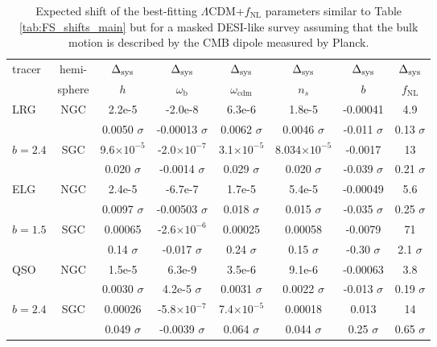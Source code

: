 \documentclass[a4paper,11pt]{article}
\begin{document}
\begin{table}[ht]
    \centering
    \begin{tabular}{|l|c|c|c|c|c|c|c|}
        \hline  tracer & hemi- & $\Delta_{\rm sys}$ &$\Delta_{\rm sys}$ &$\Delta_{\rm sys}$ &$\Delta_{\rm sys}$ &$\Delta_{\rm sys}$ &$\Delta_{\rm sys}$ \\
        & sphere & $h$ & $\omega_\mathrm{b}$ & $\omega_\mathrm{cdm}$ & $n_s$ & $b$ & $f_\mathrm{NL}$ \\\hline\hline
LRG & NGC   &  2.2e-5
 &  -2.0e-8
 &  6.3e-6
 &  1.8e-5
 &  -0.00041
 &  4.9\\ &
    &  0.0050 $\sigma$
 &  -0.00013 $\sigma$
 &  0.0062 $\sigma$
 &  0.0046 $\sigma$
 &  -0.011 $\sigma$
 &  0.13 $\sigma$\\
 $b = 2.4$ & SGC  &  9.6$\times 10^{-5}$
 &  -2.0$\times 10^{-7}$
 &  3.1$\times 10^{-5}$
 &  8.034$\times 10^{-5}$
 &  -0.0017
 &  13\\ &
 &  0.020 $\sigma$
 &  -0.0014 $\sigma$
 &  0.029 $\sigma$
 &  0.020 $\sigma$
 &  -0.039 $\sigma$
 &  0.21 $\sigma$\\
 \hline
 ELG & NGC  &  2.4e-5
 &  -6.7e-7
 &  1.7e-5
 &  5.4e-5
 &  -0.00049
 &  5.6\\
 &   &  0.0097 $\sigma$
 &  -0.00503 $\sigma$
 &  0.018 $\sigma$
 &  0.015 $\sigma$
 &  -0.035 $\sigma$
 &  0.25 $\sigma$\\
$b = 1.5$  & SGC  &  0.00065
 &  -2.6$\times 10^{-6}$
 &  0.00025
 &  0.00058
 &  -0.0079
 &  71\\
 &   &  0.14 $\sigma$
 &  -0.017 $\sigma$
 &  0.24 $\sigma$
 &  0.15 $\sigma$
 &  -0.30 $\sigma$
 &  2.1 $\sigma$\\\hline
 QSO  & NGC  &  1.5e-5
 &  6.3e-9
 &  3.5e-6
 &  9.1e-6
 &  -0.00063
 &  3.8 \\ &  &  0.0030 $\sigma$
 &  4.2e-5 $\sigma$
 &  0.0031 $\sigma$
 &  0.0022 $\sigma$
 &  -0.013 $\sigma$
 &  0.19 $\sigma$\\
$b = 2.4$ & SGC  &  0.00026
 &  -5.8$\times 10^{-7}$
 &  7.4$\times 10^{-5}$
 &  0.00018
 &  0.013
 &  14\\
 &  &  0.049 $\sigma$
 &  -0.0039 $\sigma$
 &  0.064 $\sigma$
 &  0.044 $\sigma$
 &  0.25 $\sigma$
 &  0.65 $\sigma$\\\hline
    \end{tabular}
    \caption{Expected shift of the best-fitting $\Lambda$CDM+$f_\mathrm{NL}$ parameters similar to Table \ref{tab:FS_shifts_main} but for a masked DESI-like survey assuming that the bulk motion is described by the CMB dipole measured by Planck.}
    \label{tab:FS_shifts_masked_DESI}
\end{table}
\end{document}
